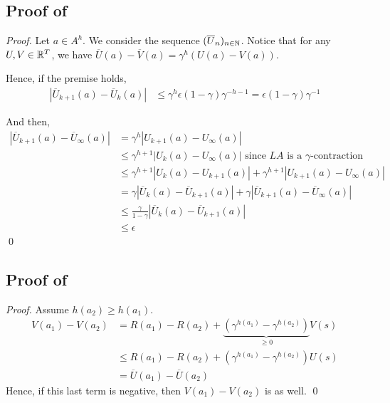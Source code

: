 \documentclass[runningheads]{llncs}
\begin{document}
\subsection{Proof of }

\begin{proof}
Let $a\in A^h$. We consider the sequence $(\overline{U}_n)_{n\in\mathbb{N}}$.
Notice that for any $U,V\in\mathbb{R}^T$, we have $\overline{U}(a)-\overline{V}(a)=\gamma^h(U(a)-V(a))$.

Hence, if the premise holds,
\begin{align*}
    |\overline{U}_{k+1}(a) - \overline{U}_{k}(a)| &\leq \gamma^h\epsilon (1-\gamma)\gamma^{-h-1} = \epsilon (1-\gamma)\gamma^{-1}
\end{align*}

And then,
\begin{align*}
|\overline{U}_{k+1}(a) - \overline{U}_\infty(a)| &= \gamma^h |U_{k+1}(a) - U_\infty(a)|\\
&\leq \gamma^{h+1}|U_{k}(a) - U_\infty(a)| \text{ since $LA$ is a $\gamma$-contraction}\\
&\leq \gamma^{h+1}|U_{k}(a) - U_{k+1}(a)| + \gamma^{h+1}|U_{k+1}(a) - U_\infty(a)|\\
&= \gamma|\overline{U}_{k}(a) - \overline{U}_{k+1}(a)| + \gamma |\overline{U}_{k+1}(a) - \overline{U}_\infty(a)|\\
&\leq \frac{\gamma}{1-\gamma} |\overline{U}_{k}(a) - \overline{U}_{k+1}(a)|\\
&\leq\epsilon
\end{align*}
\qed\end{proof}

\subsection{Proof of }

\begin{proof}
Assume $h(a_2) \geq h(a_1)$.
\begin{align*}
    V(a_1) - V(a_2) &= R(a_1)- R(a_2) + \underbrace{\left(\gamma^{h(a_1)} - \gamma^{h(a_2)}\right)}_{\geq 0}V(s) \\
    &\leq R(a_1)- R(a_2) + \left(\gamma^{h(a_1)} - \gamma^{h(a_2)}\right)U(s)\\
    &= \overline{U}(a_1) - \overline{U}(a_2)
\end{align*}
Hence, if this last term is negative, then $V(a_1) - V(a_2)$ is as well.
\qed\end{proof}
\end{document}
